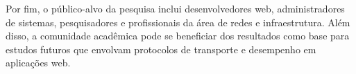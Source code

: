 Por fim, o público-alvo da pesquisa inclui desenvolvedores web, administradores de sistemas, pesquisadores e profissionais da área de redes e infraestrutura. Além disso, a comunidade acadêmica pode se beneficiar dos resultados como base para estudos futuros que envolvam protocolos de transporte e desempenho em aplicações web.